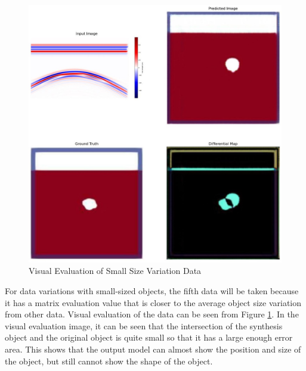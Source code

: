 \documentclass[conference]{IEEEtran}
\begin{document}
\begin{figure}[ht]
  \centering
  \includegraphics[scale=0.15]{gambar/diffMapKecil.jpg}
  \caption{Visual Evaluation of Small Size Variation Data}
  \label{fig:diffmapkecil}
\end{figure}

For data variations with small-sized objects, the fifth data will be taken because it has a matrix evaluation value that is closer to the average object size variation from other data.
Visual evaluation of the data can be seen from Figure \ref{fig:diffmapkecil}.
In the visual evaluation image, it can be seen that the intersection of the synthesis object and the original object is quite small so that it has a large enough error area.
This shows that the output model can almost show the position and size of the object, but still cannot show the shape of the object.
\end{document}
